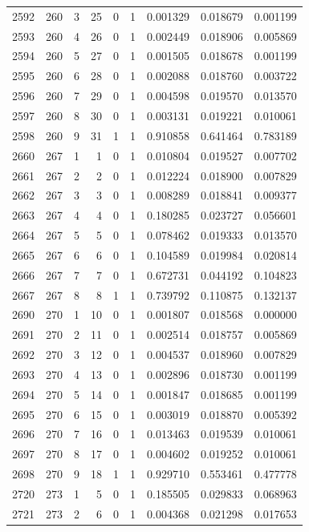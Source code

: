 \begin{longtable}{rrrrrrrrr}
2592 & 260 & 3 & 25 & 0 & 1 & 0.001329 & 0.018679 & 0.001199 \\
2593 & 260 & 4 & 26 & 0 & 1 & 0.002449 & 0.018906 & 0.005869 \\
2594 & 260 & 5 & 27 & 0 & 1 & 0.001505 & 0.018678 & 0.001199 \\
2595 & 260 & 6 & 28 & 0 & 1 & 0.002088 & 0.018760 & 0.003722 \\
2596 & 260 & 7 & 29 & 0 & 1 & 0.004598 & 0.019570 & 0.013570 \\
2597 & 260 & 8 & 30 & 0 & 1 & 0.003131 & 0.019221 & 0.010061 \\
2598 & 260 & 9 & 31 & 1 & 1 & 0.910858 & 0.641464 & 0.783189 \\
2660 & 267 & 1 & 1 & 0 & 1 & 0.010804 & 0.019527 & 0.007702 \\
2661 & 267 & 2 & 2 & 0 & 1 & 0.012224 & 0.018900 & 0.007829 \\
2662 & 267 & 3 & 3 & 0 & 1 & 0.008289 & 0.018841 & 0.009377 \\
2663 & 267 & 4 & 4 & 0 & 1 & 0.180285 & 0.023727 & 0.056601 \\
2664 & 267 & 5 & 5 & 0 & 1 & 0.078462 & 0.019333 & 0.013570 \\
2665 & 267 & 6 & 6 & 0 & 1 & 0.104589 & 0.019984 & 0.020814 \\
2666 & 267 & 7 & 7 & 0 & 1 & 0.672731 & 0.044192 & 0.104823 \\
2667 & 267 & 8 & 8 & 1 & 1 & 0.739792 & 0.110875 & 0.132137 \\
2690 & 270 & 1 & 10 & 0 & 1 & 0.001807 & 0.018568 & 0.000000 \\
2691 & 270 & 2 & 11 & 0 & 1 & 0.002514 & 0.018757 & 0.005869 \\
2692 & 270 & 3 & 12 & 0 & 1 & 0.004537 & 0.018960 & 0.007829 \\
2693 & 270 & 4 & 13 & 0 & 1 & 0.002896 & 0.018730 & 0.001199 \\
2694 & 270 & 5 & 14 & 0 & 1 & 0.001847 & 0.018685 & 0.001199 \\
2695 & 270 & 6 & 15 & 0 & 1 & 0.003019 & 0.018870 & 0.005392 \\
2696 & 270 & 7 & 16 & 0 & 1 & 0.013463 & 0.019539 & 0.010061 \\
2697 & 270 & 8 & 17 & 0 & 1 & 0.004602 & 0.019252 & 0.010061 \\
2698 & 270 & 9 & 18 & 1 & 1 & 0.929710 & 0.553461 & 0.477778 \\
2720 & 273 & 1 & 5 & 0 & 1 & 0.185505 & 0.029833 & 0.068963 \\
2721 & 273 & 2 & 6 & 0 & 1 & 0.004368 & 0.021298 & 0.017653 \\

\end{longtable}
